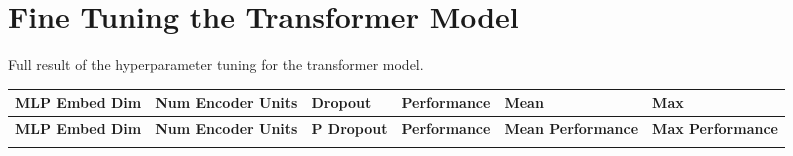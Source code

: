 \chapter{Fine Tuning the Transformer Model}
\label{appendix:transformer-hyperparameter-tuning}

Full result of the hyperparameter tuning for the transformer model.

\begin{longtable}{|>{\raggedright\arraybackslash}p{2cm}|>{\raggedright\arraybackslash}p{2cm}|>{\raggedright\arraybackslash}p{2cm}|>{\raggedright\arraybackslash}p{3.5cm}|>{\raggedright\arraybackslash}p{2cm}|>{\raggedright\arraybackslash}p{2cm}|}
    \hline
    \textbf{MLP Embed Dim} & \textbf{Num Encoder Units} & \textbf{Dropout} & \textbf{Performance} & \textbf{Mean} & \textbf{Max} \\
    \hline
    \endfirsthead
    
    \hline
    \textbf{MLP Embed Dim} & \textbf{Num Encoder Units} & \textbf{P Dropout} & \textbf{Performance} & \textbf{Mean Performance} & \textbf{Max Performance} \\
    \hline
    \endhead
    
    \hline
    \endfoot
    

\end{longtable}

